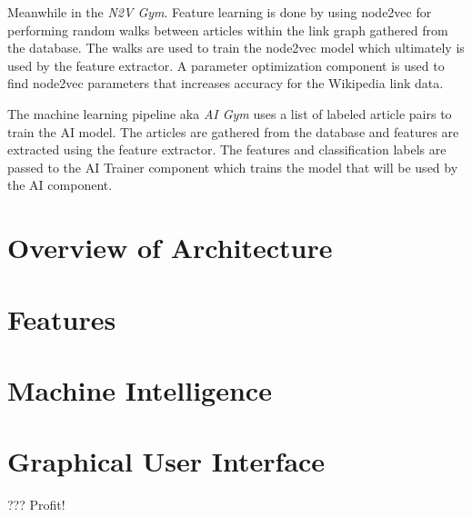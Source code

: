Meanwhile in the \textit{N2V Gym\texttrademark}. Feature learning is done by using node2vec for performing random walks between articles within the link graph gathered from the database. The walks are used to train the node2vec model which ultimately is used by the feature extractor.
A parameter optimization component is used to find node2vec parameters that increases accuracy for the Wikipedia link data.

The machine learning pipeline aka \textit{AI Gym\texttrademark} uses a list of labeled article pairs to train the AI model. The articles are gathered from the database and features are extracted using the feature extractor. The features and classification labels are passed to the AI Trainer component which trains the model that will be used by the AI component.


\section{Overview of Architecture}\label{sec:architecture}

\section{Features}

\section{Machine Intelligence}

\section{Graphical User Interface}
??? Profit!